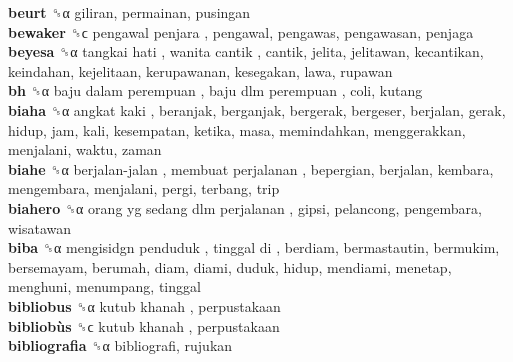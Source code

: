 \textbf{beurt} ␝α  giliran, permainan, pusingan  \\
\textbf{bewaker} ␝ϲ   pengawal penjara , pengawal, pengawas, pengawasan, penjaga  \\
\textbf{beyesa} ␝α   tangkai hati ,  wanita cantik , cantik, jelita, jelitawan, kecantikan, keindahan, kejelitaan, kerupawanan, kesegakan, lawa, rupawan  \\
\textbf{bh} ␝α   baju dalam perempuan ,  baju dlm perempuan , coli, kutang  \\
\textbf{biaha} ␝α   angkat kaki , beranjak, berganjak, bergerak, bergeser, berjalan, gerak, hidup, jam, kali, kesempatan, ketika, masa, memindahkan, menggerakkan, menjalani, waktu, zaman  \\
\textbf{biahe} ␝α   berjalan-jalan ,  membuat perjalanan , bepergian, berjalan, kembara, mengembara, menjalani, pergi, terbang, trip  \\
\textbf{biahero} ␝α   orang yg sedang dlm perjalanan , gipsi, pelancong, pengembara, wisatawan  \\
\textbf{biba} ␝α   mengisidgn penduduk ,  tinggal di , berdiam, bermastautin, bermukim, bersemayam, berumah, diam, diami, duduk, hidup, mendiami, menetap, menghuni, menumpang, tinggal  \\
\textbf{bibliobus} ␝α   kutub khanah , perpustakaan  \\
\textbf{bibliobùs} ␝ϲ   kutub khanah , perpustakaan  \\
\textbf{bibliografia} ␝α  bibliografi, rujukan  \\
